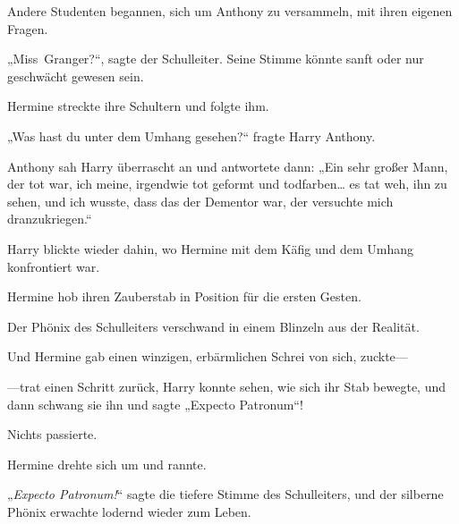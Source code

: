 Andere Studenten begannen, sich um Anthony zu versammeln, mit ihren eigenen Fragen.

„Miss~Granger?“, sagte der Schulleiter. Seine Stimme könnte sanft oder nur geschwächt gewesen sein.

Hermine streckte ihre Schultern und folgte ihm.

„Was hast du unter dem Umhang gesehen?“ fragte Harry Anthony.

Anthony sah Harry überrascht an und antwortete dann: „Ein sehr großer Mann, der tot war, ich meine, irgendwie tot geformt und todfarben… es tat weh, ihn zu sehen, und ich wusste, dass das der Dementor war, der versuchte mich dranzukriegen.“

Harry blickte wieder dahin, wo Hermine mit dem Käfig und dem Umhang konfrontiert war.

Hermine hob ihren Zauberstab in Position für die ersten Gesten.

Der Phönix des Schulleiters verschwand in einem Blinzeln aus der Realität.

Und Hermine gab einen winzigen, erbärmlichen Schrei von sich, zuckte—

—trat einen Schritt zurück, Harry konnte sehen, wie sich ihr Stab bewegte, und dann schwang sie ihn und sagte „Expecto Patronum“!

Nichts passierte.

Hermine drehte sich um und rannte.

„\emph{Expecto Patronum!}“ sagte die tiefere Stimme des Schulleiters, und der silberne Phönix erwachte lodernd wieder zum Leben.

